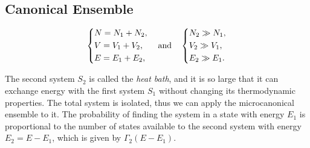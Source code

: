 \subsection{Canonical Ensemble}

\begin{figure}[H]
    \begin{minipage}{0.5\textwidth}
        \centering
    \end{minipage}
    \hfill
    \begin{minipage}{0.45\textwidth}
        \[
            \begin{dcases}
                N = N_1 + N_2, \\
                V = V_1 + V_2, \\
                E = E_1 + E_2,
            \end{dcases} \quad \text{and} \quad
            \begin{dcases}
                N_2 \gg N_1, \\
                V_2 \gg V_1, \\
                E_2 \gg E_1.
            \end{dcases}
        \]
    \end{minipage}
\end{figure}

The second system \(S_2\) is called the \textit{heat bath}, and it is so large that it can exchange energy with the first system \(S_1\) without changing its thermodynamic properties. The total system is isolated, thus we can apply the microcanonical ensemble to it. The probability of finding the system in a state with energy \(E_1\) is proportional to the number of states available to the second system with energy \(E_2 = E - E_1\), which is given by \(\Gamma_2(E - E_1)\).

